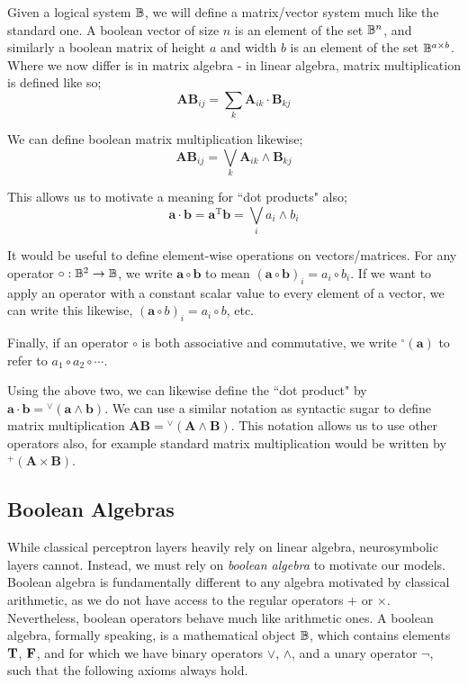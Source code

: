 \documentclass[conference]{report}
\begin{document}
Given a logical system $\mathbb{B}$, we will define a matrix/vector system much like the standard one. A boolean vector of size $n$ is an element of the set $\mathbb{B}^n$, and similarly a boolean matrix of height $a$ and width $b$ is an element of the set $\mathbb{B}^{a \times b}$. Where we now differ is in matrix algebra - in linear algebra, matrix multiplication is defined like so;
$$\mathbf{AB}_{ij} = \sum_{k}\mathbf{A}_{ik}\cdot\mathbf{B}_{kj}$$

We can define boolean matrix multiplication likewise;
$$\mathbf{AB}_{ij} = \bigvee_{k}\mathbf{A}_{ik}\land\mathbf{B}_{kj}$$

This allows us to motivate a meaning for ``dot products" also;
$$\mathbf{a\cdot b} = \mathbf{a}^\text{T}\mathbf{b} = \bigvee_i a_i \land b_i$$

It would be useful to define element-wise operations on vectors/matrices. For any operator $\circ : \mathbb{B}^2 \to \mathbb{B}$, we write $\mathbf{a} \circ \mathbf{b}$ to mean $(\mathbf{a} \circ \mathbf{b})_i = a_i \circ b_i$. If we want to apply an operator with a constant scalar value to every element of a vector, we can write this likewise, $(\mathbf{a} \circ b)_i = a_i \circ b$, etc.

Finally, if an operator $\circ$ is both associative and commutative, we write $^\circ(\mathbf{a})$ to refer to $a_1 \circ a_2 \circ \cdots$.

Using the above two, we can likewise define the ``dot product" by $\mathbf{a \cdot b} ={^\lor}(\mathbf{a \land b})$. We can use a similar notation as syntactic sugar to define matrix multiplication $\mathbf{AB} ={^\lor}(\mathbf{A \land B})$. This notation allows us to use other operators also, for example standard matrix multiplication would be written by ${^+}(\mathbf{A \times B})$. 

\subsection{Boolean Algebras}

While classical perceptron layers heavily rely on linear algebra, neurosymbolic layers cannot. Instead, we must rely on \textit{boolean algebra} to motivate our models. Boolean algebra is fundamentally different to any algebra motivated by classical arithmetic, as we do not have access to the regular operators $+$ or $\times$. Nevertheless, boolean operators behave much like arithmetic ones. A boolean algebra, formally speaking, is a mathematical object $\mathbb{B}$, which contains elements $\textbf{T}$, $\textbf{F}$, and for which we have binary operators $\lor$, $\land$, and a unary operator $\neg$, such that the following axioms always hold.
\end{document}
